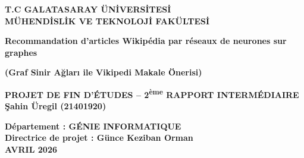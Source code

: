 \begin{titlepage}
    \begin{center}
    	\large
        \vspace{-0.5cm}
    	\textbf{T.C GALATASARAY ÜN\.{I}VERS\.{I}TES\.{I}}\\
        \textbf{MÜHEND\.{I}SL\.{I}K VE TEKNOLOJ\.{I} FAKÜLTES\.{I}}
        \vspace{3.0cm}
        
        \textbf{Recommandation d'articles Wikipédia par réseaux de neurones sur graphes}
        
        \textbf{(Graf Sinir Ağları ile Vikipedi Makale Önerisi)}
        
        \vspace{1.5cm}
        
        \textbf{PROJET DE FIN D'ÉTUDES -- 2\textsuperscript{ème} RAPPORT INTERMÉDIAIRE}\\
        
        \textbf{Şahin Üregil (21401920)}
       
        \vspace{1.5cm}
      
        
        \textbf{Département : GÉNIE INFORMATIQUE}\\
        \textbf{Directrice de projet : Günce Keziban Orman}\\
        \vfill
        \textbf{AVRIL 2026}
       
    \end{center}
\end{titlepage}
\restoregeometry